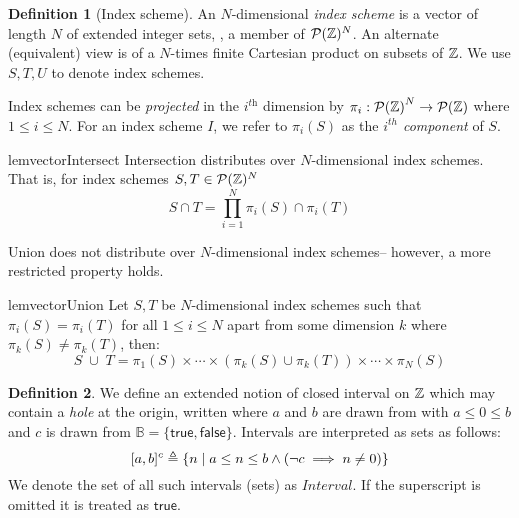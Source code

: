 \documentclass[acmlarge,review,anonymous]{acmart}\settopmatter{printfolios=true}
\theoremstyle{definition}
\newtheorem{defn}{Definition}
\theoremstyle{plain}
\begin{document}
\begin{defn}[Index scheme]
  An $N$-dimensional \emph{index scheme} is a vector of length $N$ of
  extended integer sets, \ie{}, a member of $\mathcal{P}(\textnormal{$\mathbb{Z}$})^{N}$.
  An alternate (equivalent) view is of a $N$-times finite Cartesian
  product on subsets of $\textnormal{$\mathbb{Z}$}$.  We use $S, T, U$ to denote index
  schemes.

Index schemes can be \emph{projected} in the $i^{\textit{th}}$ dimension by
  $\pi_i : {\mathcal{P}(\textnormal{$\mathbb{Z}$}{})}^N \to \mathcal{P}(\textnormal{$\mathbb{Z}$}{})$ where $1 \leq i
  \leq N$. For an index scheme $I$, we refer to $\pi_i(S)$ as the
  \emph{$i^{th}$ component} of $S$.
\end{defn}


\begin{restatable}{lem}{vectorIntersect}
\label{lem:vector-intersect}
  Intersection distributes over $N$-dimensional index schemes. 
  That is, for index schemes $S, T \in \mathcal{P}(\textnormal{$\mathbb{Z}$})^N$
%
  \begin{equation*}
    S \cap T = \prod_{i = 1}^{N} \pi_i(S) \cap \pi_i(T)
  \end{equation*}
\end{restatable}

 Union does not distribute over $N$-dimensional index schemes--
 however, a more restricted property holds.

\begin{restatable}{lem}{vectorUnion}
\label{lem:vector-union}
Let $S, T$ be $N$-dimensional index schemes such that
$\pi_i(S) = \pi_i(T)$ for all $1 \leq i \leq N$ apart 
from some dimension $k$ where $\pi_k(S) \neq \pi_k(T)$,
then:
%
  \begin{equation*}
    S \; \cup \; T
    =
    \pi_1(S) \times \cdots \times
    (\pi_k(S) \cup \pi_k(T)) \times \cdots \times
    \pi_N(S)
  \end{equation*}
%
\end{restatable}
%

\begin{defn}
  We define an extended notion of closed interval on $\textnormal{$\mathbb{Z}$}{}$ which may contain
  a \emph{hole} at the origin, written  where $a$ and $b$ are
  drawn from \bz{} with $a \leq 0 \leq b$
   and $c$ is drawn from $\mathbb{B} = \{ \mathsf{true}, \mathsf{false}
  \}$. Intervals are interpreted as sets as follows:
%
  \begin{equation*}
    \textnormal{$\lbrack a,b\rbrack^{c}$} \triangleq
      \{ n \mid a \leq n \leq b \wedge (\neg c \implies n \neq 0) \}
  \end{equation*}
%
  We denote the set of all such intervals (sets) as
   $\textit{Interval}$. If the superscript is
  omitted it is treated as $\mathsf{true}$.
\end{defn}
\end{document}
